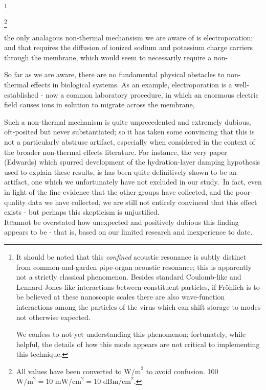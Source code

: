 \documentclass[paper.tex]{subfiles}
\begin{document}
\begin{multicols}{1}
\footnote{It should be noted that this {\it confined} acoustic resonance is subtly distinct from common-and-garden pipe-organ acoustic resonance; this is apparently not a strictly classical phenomenon. Besides standard Coulomb-like and Lennard-Jones-like interactions between constituent particles, if Fr\"{o}hlich is to be believed at these nanoscopic scales there are also wave-function interactions among the particles of the virus which can shift storage to modes not otherwise expected.
	
	We confess to not yet understanding this phenomenon; fortunately, while helpful, the details of how this mode appears are not critical to implementing this technique.}


\footnote{All values have been converted to $\text{W/m}^2$ to avoid confusion. 100 $\text{W/m}^2 = 10 \text{ mW/cm}^2 = 10 \text{ dBm/cm}^2$.}




the only analagous non-thermal mechansism we are aware of is electroporation; and that requires the diffusion of ionized sodium and potassium charge carriers through the membrane, which would seem to necessarily require a non-



So far as we are aware, there are no fundamental physical obstacles to non-thermal effects in biological systems. As an example, electroporation is a well-established - now a common laboratory procedure, in which an enormous electric field causes ions in solution to migrate across the membrane, 


Such a non-thermal mechanism is quite unprecedented and extremely dubious, oft-posited but never substantiated; so it has taken some convincing that this is not a particularly abstruse artifact, especially when considered in the context of the broader non-thermal effects literature. For instance, the very paper (Edwards) which spurred development of the hydration-layer damping hypothesis used to explain these results, is has been quite\cite{Resonances1987} definitively\cite{Microwave1993a} shown to be an artifact, one which we unfortunately have not excluded in our study.\ In fact, even in light of the fine evidence that the other groups have collected, and the poor-quality data we have collected, we are still not entirely convinced that this effect exists - but perhaps this skepticism is unjustified.\\



\lettrine{It} cannot be overstated how unexpected and positively dubious this finding appears to be - that is, based on our limited research and inexperience to date.


\end{multicols}
\end{document}
